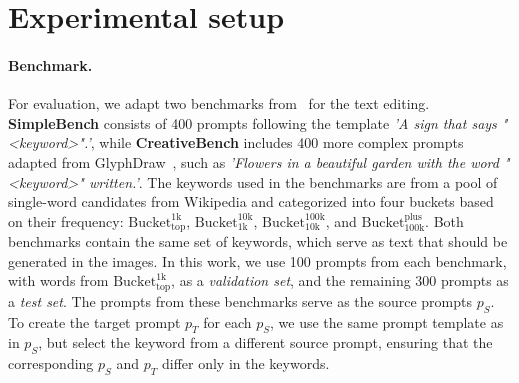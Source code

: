 \section{Experimental setup}
\label{sec:setup}


\paragraph{Benchmark.} For evaluation, we adapt two benchmarks from~\cite{yang2024glyphcontrol} for the text editing. \textbf{SimpleBench} consists of 400 prompts following the template \textit{'A sign that says "\textless keyword\textgreater".'}, while \textbf{CreativeBench} includes 400 more complex prompts adapted from GlyphDraw~\cite{ma2023glyphdraw}, such as \textit{'Flowers in a beautiful garden with the word "\textless keyword\textgreater" written.'}.
The keywords used in the benchmarks are from a pool of single-word candidates from Wikipedia and categorized into four buckets based on their frequency: \textbf{$\text{Bucket}^{\text{1k}}_{\text{top}}$}, \textbf{$\text{Bucket}^{\text{10k}}_{\text{1k}}$}, \textbf{$\text{Bucket}^{\text{100k}}_{\text{10k}}$}, and \textbf{$\text{Bucket}^{\text{plus}}_{\text{100k}}$}. Both benchmarks contain the same set of keywords, which serve as text that should be generated in the images.
In this work, we use 100 prompts from each benchmark, with words from \textbf{$\text{Bucket}^{\text{1k}}_{\text{top}}$}, as a \textit{validation set}, and the remaining 300 prompts as a \textit{test set}. The prompts from these benchmarks serve as the source prompts $p_{S}$. To create the target prompt $p_{T}$ for each $p_{S}$, we use the same prompt template as in $p_{S}$, but select the keyword from a different source prompt, ensuring that the corresponding $p_{S}$ and $p_{T}$ differ only in the keywords.


